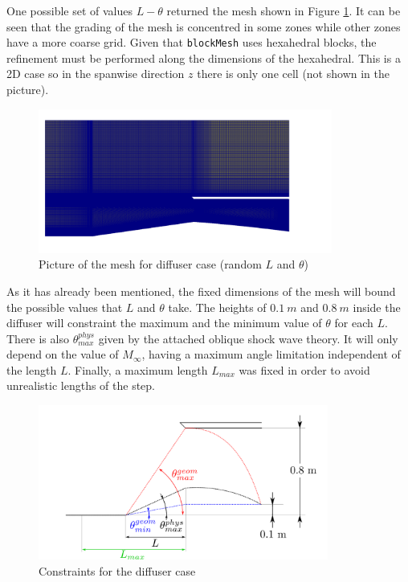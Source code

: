 One possible set of values $L-\theta$ returned the mesh shown in Figure \ref{fig:diffuserMeshPF}. It can be seen that the grading of the mesh is concentred in some zones while other zones have a more coarse grid. Given that \texttt{blockMesh} uses hexahedral blocks, the refinement must be performed along the dimensions of the hexahedral. This is a 2D case so in the spanwise direction $z$ there is only one cell (not shown in the picture).

     \begin{figure}[h!]
        \centering
        \includegraphics[width=0.86\textwidth]{Figures/3/diffuserMeshPF.png}
        \caption{Picture of the mesh for diffuser case (random $L$ and $\theta$)}
        \label{fig:diffuserMeshPF}
    \end{figure}
    
   \newpage
   
   As it has already been mentioned, the fixed dimensions of the mesh will bound the possible values that $L$ and $\theta$ take. The heights of $0.1\ m$ and $0.8\ m$ inside the diffuser will constraint the maximum and the minimum value of $\theta$ for each $L$. There is also $\theta^{phys}_{max}$ given by the attached oblique shock wave theory. It will only depend on the value of $M_\infty$, having a maximum angle limitation independent of the length $L$. Finally, a maximum length $L_{max}$ was fixed in order to avoid unrealistic lengths of the step.
      
     \begin{figure}[h!]
        \centering
        \includegraphics[width=0.85\textwidth]{Figures/3/diffuserConst4.png}
        \caption{Constraints for the diffuser case}
        \label{fig:diffuserConstr}
    \end{figure}

